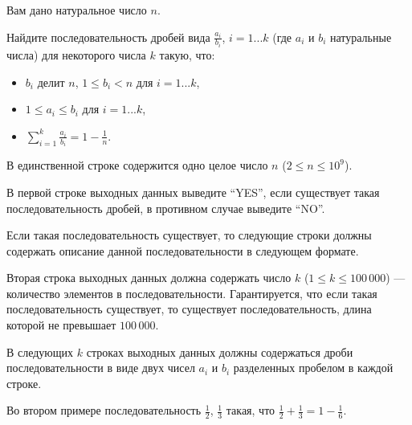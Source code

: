 
\Legend
Вам дано натуральное число $n$.

Найдите последовательность дробей вида $\frac{a_i}{b_i}$, $i = 1...k$
(где $a_i$ и $b_i$ натуральные числа) для некоторого числа $k$ такую, что:

\begin{itemize}
	\item $b_i$ делит $n$, $1 \le b_i < n$ для $i = 1...k$,
	\item $1 \le a_i \le b_i$ для $i = 1...k$,
	\item $\sum_{i = 1}^{k} \frac{a_i}{b_i} = 1 - \frac{1}{n}$.
\end{itemize}

\Input
В единственной строке содержится одно целое число $n$ ($2 \le n \le 10^9$).

\Output
В первой строке выходных данных выведите ``YES'', если существует такая последовательность дробей, в противном случае выведите ``NO''.

Если такая последовательность существует, то следующие строки должны содержать описание данной последовательности в следующем формате.

Вторая строка выходных данных должна содержать число $k$ ($1 \le k \le 100\,000$) --- количество элементов в последовательности.
Гарантируется, что если такая последовательность существует, то существует последовательность, длина которой не превышает $100\,000$.

В следующих $k$ строках выходных данных должны содержаться дроби последовательности в виде двух чисел $a_i$ и $b_i$ разделенных пробелом в каждой строке.

\Samples
\BeginTests
{}
\EndTests

Во втором примере последовательность $\frac{1}{2}$, $\frac{1}{3}$ такая, что $\frac{1}{2} + \frac{1}{3} = 1 - \frac{1}{6}$.

\EndProblem
